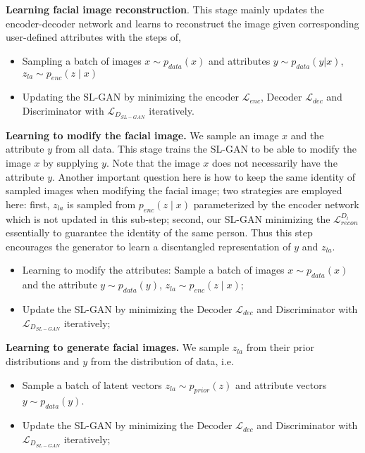 \documentclass[10pt,letterpaper,twocolumn]{article}
\begin{document}
\vspace{0.07in}
\noindent \textbf{Learning facial image reconstruction}. This stage mainly updates
the encoder-decoder network and learns to reconstruct the image given
corresponding user-defined attributes with the steps of, 
\begin{itemize}
\item Sampling a batch of images $x\sim p_{data}(x)$ and attributes $y\sim p_{data}(y|x)$,
$z_{la}\sim p_{enc}\left(z\mid x\right)$ 
\item Updating the SL-GAN by minimizing the encoder $\mathcal{L}_{enc}$,
Decoder $\mathcal{L}_{dec}$ and Discriminator with $\mathcal{L}_{D_{SL-GAN}}$
iteratively. 
\end{itemize}
\noindent \textbf{Learning to modify the facial image.} We sample
an image $x$ and the attribute $y$ from all data. This stage trains
the SL-GAN to be able to modify the image $x$ by supplying $y$.
Note that the image $x$ does not necessarily have the attribute $y$.
Another important question here is how to keep the same identity of
sampled images when modifying the facial image; two strategies are
employed here: first, $z_{la}$ is sampled from $p_{enc}\left(z\mid x\right)$
parameterized by the encoder network which is not updated in this
sub-step; second, our SL-GAN minimizing the $\mathcal{L}_{recon}^{D_{l}}$
essentially to guarantee the identity of the same person. Thus this
step encourages the generator to learn a disentangled representation
of $y$ and $z_{la}$. 
\begin{itemize}
\item Learning to modify the attributes: Sample a batch of images $x\sim p_{data}(x)$
and the attribute $y\sim p_{data}(y)$, $z_{la}\sim p_{enc}\left(z\mid x\right)$; 
\item Update the SL-GAN by minimizing the Decoder $\mathcal{L}_{dec}$ and
Discriminator with $\mathcal{L}_{D_{SL-GAN}}$ iteratively; 
\end{itemize}
\noindent \textbf{Learning to generate facial images.} We sample $z_{la}$
from their prior distributions and $y$ from the distribution of data,
i.e. 
\begin{itemize}
\item Sample a batch of latent vectors $z_{la}\sim p_{prior}(z)$ and attribute
vectors $y\sim p_{data}(y)$. 
\item Update the SL-GAN by minimizing the Decoder $\mathcal{L}_{dec}$ and
Discriminator with $\mathcal{L}_{D_{SL-GAN}}$ iteratively; 
\end{itemize}
\end{document}
